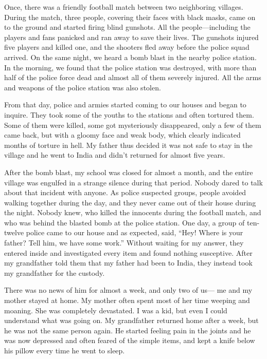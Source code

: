 \documentclass[oneside,12pt]{book}
\begin{document}
Once, there was a friendly football match between two neighboring villages. During the match, three people, covering their faces with black masks, came on to the ground and started firing blind gunshots. All the people—including the players and fans panicked and ran away to save their lives. The gunshots injured five players and killed one, and the shooters fled away before the police squad arrived. On the same night, we heard a bomb blast in the nearby police station. In the morning, we found that the police station was destroyed, with more than half of the police force dead and almost all of them severely injured. All the arms and weapons of the police station was also stolen. 

From that day, police and armies started coming to our houses and began to inquire. They took some of the youths to the stations and often tortured them. Some of them were killed, some got mysteriously disappeared, only a few of them came back, but with a gloomy face and weak body, which clearly indicated months of torture in hell. My father thus decided it was not safe to stay in the village and he went to India and didn’t returned for almost five years. 

After the bomb blast, my school was closed for almost a month, and the entire village was engulfed in a strange silence during that period. Nobody dared to talk about that incident with anyone. As police suspected groups, people avoided walking together during the day, and they never came out of their house during the night. Nobody knew, who killed the innocents during the football match, and who was behind the blasted bomb at the police station. 
One day, a group of ten-twelve police came to our house and as expected, said, “Hey! Where is your father? Tell him, we have some work.” Without waiting for my answer, they entered inside and investigated every item and found nothing susceptive.  After my grandfather told them that my father had been to India, they instead took my grandfather for the custody. 

There was no news of him for almost a week, and only two of us— me and my mother stayed at home. My mother often spent most of her time weeping
and moaning. She was completely devastated. I was a kid, but even I could understand what was going on. My grandfather returned home after a week, but he was not the same person again. He started feeling pain in the joints and he was now depressed and often feared of the simple items, and kept a knife below his pillow every time he went to sleep. 
\end{document}
